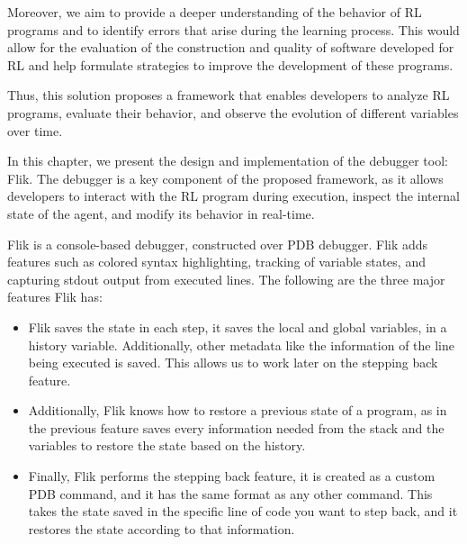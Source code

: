 Moreover, we aim to provide a deeper understanding of the behavior of 
RL programs and to identify errors that arise during the learning process. 
This would allow for the evaluation of the construction and quality of 
software developed for RL and help formulate strategies to improve the 
development of these programs.

Thus, this solution proposes a framework that enables developers to 
analyze RL programs, evaluate their behavior, and observe the evolution 
of different variables over time.

In this chapter, we present the design and implementation of the debugger tool: \ac{Flik}.
The debugger is a key component of the proposed framework, as it allows 
developers to interact with the RL program during execution, inspect the 
internal state of the agent, and modify its behavior in real-time.

\ac{Flik} is a console-based debugger, constructed over \ac{PDB} debugger. \ac{Flik} adds features 
such as colored syntax highlighting, tracking of variable states, and capturing stdout output 
from executed lines. The following are the three major features \ac{Flik} has:
\begin{itemize}
    \item \ac{Flik} saves the state in each step, it saves the local and global variables, 
    in a history variable. Additionally, other metadata like the information of the line 
    being executed is saved. This allows us to work later on the stepping back feature. 
    \item Additionally, \ac{Flik} knows how to restore a previous state of a program, as 
    in the previous feature saves every information needed from the stack and the variables 
    to restore the state based on the history. 
    \item Finally, \ac{Flik} performs the stepping back feature, it is created as a custom 
    \ac{PDB} command, and it has the same format as any other command. This takes the state
    saved in the specific line of code you want to step back, and it restores the state according
    to that information. 
\end{itemize}

